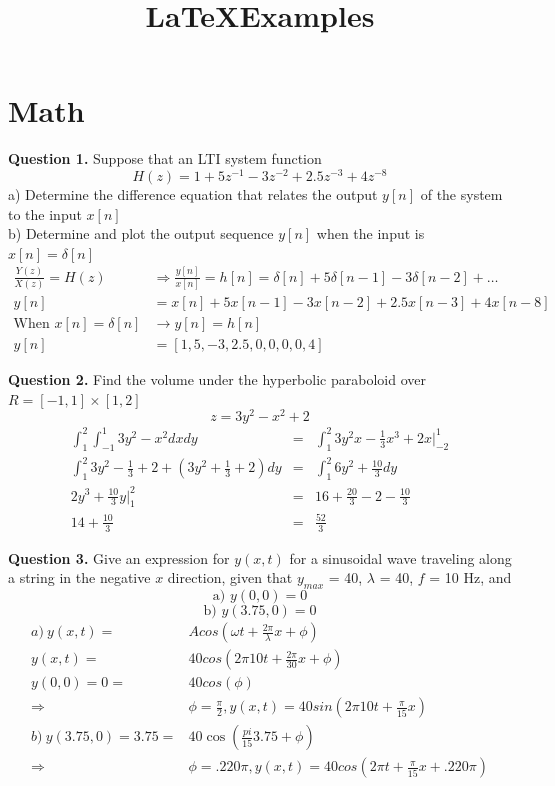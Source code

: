 \documentclass[]{article}
\title{\LaTeX Examples}
\author{}
\begin{document}
\maketitle

\tableofcontents
\clearpage

\section{Math}

\textbf{Question 1. } Suppose that an LTI system function 
$$H(z) = 1+5z^{-1}-3z^{-2}+2.5z^{-3}+4z^{-8}$$
a) Determine the difference equation that relates the output $y[n]$ of the system to the input $x[n]$\\
b) Determine and plot the output sequence $y[n]$ when the input is $x[n]=\delta[n]$
\begin{align*}
	\frac{Y(z)}{X(z)} = H(z) & \Rightarrow  \frac{y[n]}{x[n]} = h[n] = \delta[n] + 5\delta[n-1] - 3\delta[n-2] + \ldots\\
	y[n] &= x[n] + 5x[n-1] -3x[n-2] + 2.5x[n-3] + 4x[n-8]\\
	\text{When } x[n] = \delta[n] &\rightarrow y[n] = h[n]\\
	y[n] &= [1,5,-3,2.5,0,0,0,0, 4]
\end{align*}

\noindent\textbf{Question 2.} Find the volume under the hyperbolic paraboloid over $R = [-1,1] \times [1,2]$
$$z = 3y^2 - x^2 + 2$$
\begin{align*}
	\int^2_1\int^1_{-1} 3y^2 -x^2 dxdy & =  & \int_1^2 3y^2x -\frac{1}{3}x^3+2x\vert^1_{-2}\\
	\int^2_1 3y^2-\frac{1}{3} + 2 + (3y^2 + \frac{1}{3} + 2) dy & = & \int_1^2 6y^2 + \frac{10}{3} dy\\
	2y^3+\frac{10}{3}y\vert_1^2 & = & 16 + \frac{20}{3} - 2 - \frac{10}{3} \\
	14 + \frac{10}{3} & = & \frac{52}{3}
\end{align*}

\noindent\textbf{Question 3.} Give an expression for $y(x,t)$ for a sinusoidal wave traveling along a string in the negative $x$ direction, given that $y_{max}$ = 40, $\lambda$ = 40, $f$ = 10 Hz, and
$$\text{a) } y(0,0) = 0$$
$$\text{b) } y(3.75, 0) = 0$$  
\begin{align*}
	a)\ y(x,t) = & A cos(\omega t + \frac{2\pi}{\lambda}x + \phi)\\
	y(x,t) = & 40 cos(2\pi 10 t + \frac{2 \pi}{30} x + \phi)\\
	y(0,0) = 0 = & 40 cos(\phi)\\
	\Rightarrow & \phi = \frac{\pi}{2}, y(x,t) = 40 sin(2\pi 10t + \frac{\pi}{15}x)\\
	b)\ y(3.75,0) = 3.75 = & 40\cos(\frac{pi}{15}3.75 + \phi)\\
	\Rightarrow & \phi = .220 \pi, y(x, t) = 40cos(2\pi t + \frac{\pi}{15}x + .220\pi)
\end{align*}
\end{document}
